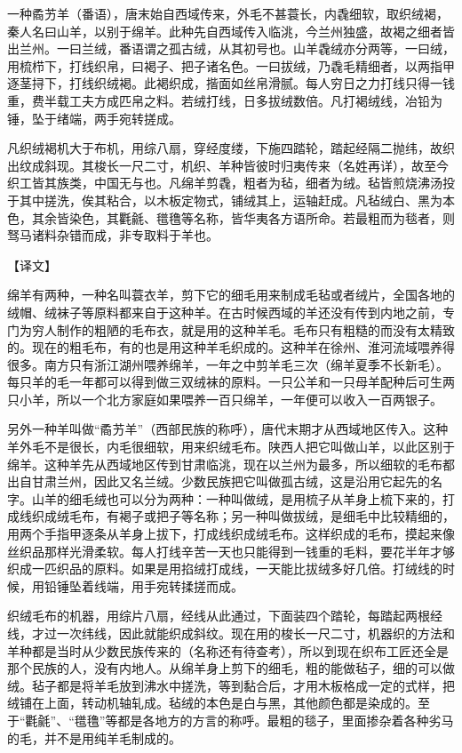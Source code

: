 \documentclass[12pt,UTF8]{ctexbook}
\begin{document}
一种矞艻羊（番语），唐末始自西域传来，外毛不甚蓑长，内毳细软，取织绒褐，秦人名曰山羊，以别于绵羊。此种先自西域传入临洮，今兰州独盛，故褐之细者皆出兰州。一曰兰绒，番语谓之孤古绒，从其初号也。山羊毳绒亦分两等，一曰绒，用梳栉下，打线织帛，曰褐子、把子诸名色。一曰拔绒，乃毳毛精细者，以两指甲逐茎挦下，打线织绒褐。此褐织成，揩面如丝帛滑腻。每人穷日之力打线只得一钱重，费半载工夫方成匹帛之料。若绒打线，日多拔绒数倍。凡打褐绒线，冶铅为锤，坠于绪端，两手宛转搓成。

凡织绒褐机大于布机，用综八扇，穿经度缕，下施四踏轮，踏起经隔二抛纬，故织出纹成斜现。其梭长一尺二寸，机织、羊种皆彼时归夷传来（名姓再详），故至今织工皆其族类，中国无与也。凡绵羊剪毳，粗者为毡，细者为绒。毡皆煎烧沸汤投于其中搓洗，俟其粘合，以木板定物式，铺绒其上，运轴赶成。凡毡绒白、黑为本色，其余皆染色，其氍毹、氆氇等名称，皆华夷各方语所命。若最粗而为毯者，则驽马诸料杂错而成，非专取料于羊也。

【译文】

绵羊有两种，一种名叫蓑衣羊，剪下它的细毛用来制成毛毡或者绒片，全国各地的绒帽、绒袜子等原料都来自于这种羊。在古时候西域的羊还没有传到内地之前，专门为穷人制作的粗陋的毛布衣，就是用的这种羊毛。毛布只有粗糙的而没有太精致的。现在的粗毛布，有的也是用这种羊毛织成的。这种羊在徐州、淮河流域喂养得很多。南方只有浙江湖州喂养绵羊，一年之中剪羊毛三次（绵羊夏季不长新毛）。每只羊的毛一年都可以得到做三双绒袜的原料。一只公羊和一只母羊配种后可生两只小羊，所以一个北方家庭如果喂养一百只绵羊，一年便可以收入一百两银子。

另外一种羊叫做“矞艻羊”（西部民族的称呼），唐代末期才从西域地区传入。这种羊外毛不是很长，内毛很细软，用来织绒毛布。陕西人把它叫做山羊，以此区别于绵羊。这种羊先从西域地区传到甘肃临洮，现在以兰州为最多，所以细软的毛布都出自甘肃兰州，因此又名兰绒。少数民族把它叫做孤古绒，这是沿用它起先的名字。山羊的细毛绒也可以分为两种：一种叫做绒，是用梳子从羊身上梳下来的，打成线织成绒毛布，有褐子或把子等名称；另一种叫做拔绒，是细毛中比较精细的，用两个手指甲逐条从羊身上拔下，打成线织成绒毛布。这样织成的毛布，摸起来像丝织品那样光滑柔软。每人打线辛苦一天也只能得到一钱重的毛料，要花半年才够织成一匹织品的原料。如果是用掐绒打成线，一天能比拔绒多好几倍。打绒线的时候，用铅锤坠着线端，用手宛转揉搓而成。

织绒毛布的机器，用综片八扇，经线从此通过，下面装四个踏轮，每踏起两根经线，才过一次纬线，因此就能织成斜纹。现在用的梭长一尺二寸，机器织的方法和羊种都是当时从少数民族传来的（名称还有待查考），所以到现在织布工匠还全是那个民族的人，没有内地人。从绵羊身上剪下的细毛，粗的能做毡子，细的可以做绒。毡子都是将羊毛放到沸水中搓洗，等到黏合后，才用木板格成一定的式样，把绒铺在上面，转动机轴轧成。毡绒的本色是白与黑，其他颜色都是染成的。至于“氍毹”、“氆氇”等都是各地方的方言的称呼。最粗的毯子，里面掺杂着各种劣马的毛，并不是用纯羊毛制成的。
\end{document}
